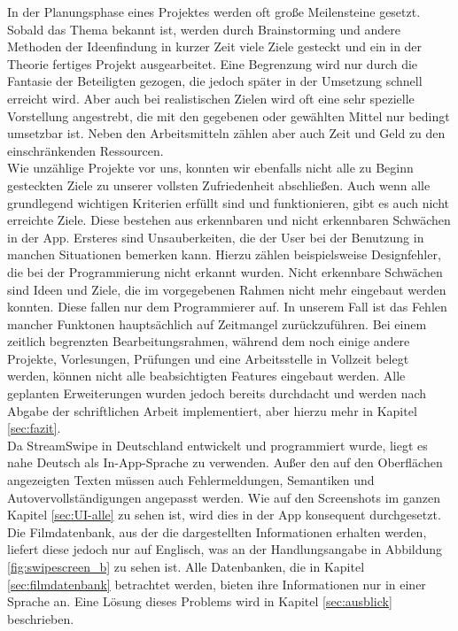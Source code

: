 In der Planungsphase eines Projektes werden oft große Meilensteine gesetzt. Sobald das Thema bekannt ist, werden durch Brainstorming und andere Methoden der Ideenfindung in kurzer Zeit viele Ziele gesteckt und ein in der Theorie fertiges Projekt ausgearbeitet. Eine Begrenzung wird nur durch die Fantasie der Beteiligten gezogen, die jedoch später in der Umsetzung schnell erreicht wird. Aber auch bei realistischen Zielen wird oft eine sehr spezielle Vorstellung angestrebt, die mit den gegebenen oder gewählten Mittel nur bedingt umsetzbar ist. Neben den Arbeitsmitteln zählen aber auch Zeit und Geld zu den einschränkenden Ressourcen.\\

\noindent
Wie unzählige Projekte vor uns, konnten wir ebenfalls nicht alle zu Beginn gesteckten Ziele zu unserer vollsten Zufriedenheit abschließen. Auch wenn alle grundlegend wichtigen Kriterien erfüllt sind und funktionieren, gibt es auch nicht erreichte Ziele. Diese bestehen aus erkennbaren und nicht erkennbaren Schwächen in der App. Ersteres sind Unsauberkeiten, die der User bei der Benutzung in manchen Situationen bemerken kann. Hierzu zählen beispielsweise Designfehler, die bei der Programmierung nicht erkannt wurden. Nicht erkennbare Schwächen sind Ideen und Ziele, die im vorgegebenen Rahmen nicht mehr eingebaut werden konnten. Diese fallen nur dem Programmierer auf. In unserem Fall ist das Fehlen mancher Funktonen hauptsächlich auf Zeitmangel zurückzuführen. Bei einem zeitlich begrenzten Bearbeitungsrahmen, während dem noch einige andere Projekte, Vorlesungen, Prüfungen und eine Arbeitsstelle in Vollzeit belegt werden, können nicht alle beabsichtigten Features eingebaut werden. Alle geplanten Erweiterungen wurden jedoch bereits durchdacht und werden nach Abgabe der schriftlichen Arbeit implementiert, aber hierzu mehr in Kapitel \ref{sec:fazit}.\\

\noindent
Da StreamSwipe in Deutschland entwickelt und programmiert wurde, liegt es nahe Deutsch als In-App-Sprache zu verwenden. Außer den auf den Oberflächen angezeigten Texten müssen auch Fehlermeldungen, Semantiken und Autovervollständigungen angepasst werden. Wie auf den Screenshots im ganzen Kapitel \ref{sec:UI-alle} zu sehen ist, wird dies in der App konsequent durchgesetzt. Die Filmdatenbank, aus der die dargestellten Informationen erhalten werden, liefert diese jedoch nur auf Englisch, was an der Handlungsangabe in Abbildung  \ref{fig:swipescreen_b} zu sehen ist. Alle Datenbanken, die in Kapitel  \ref{sec:filmdatenbank} betrachtet werden, bieten ihre Informationen nur in einer Sprache an. Eine Lösung dieses Problems wird in Kapitel \ref{sec:ausblick} beschrieben.\\

